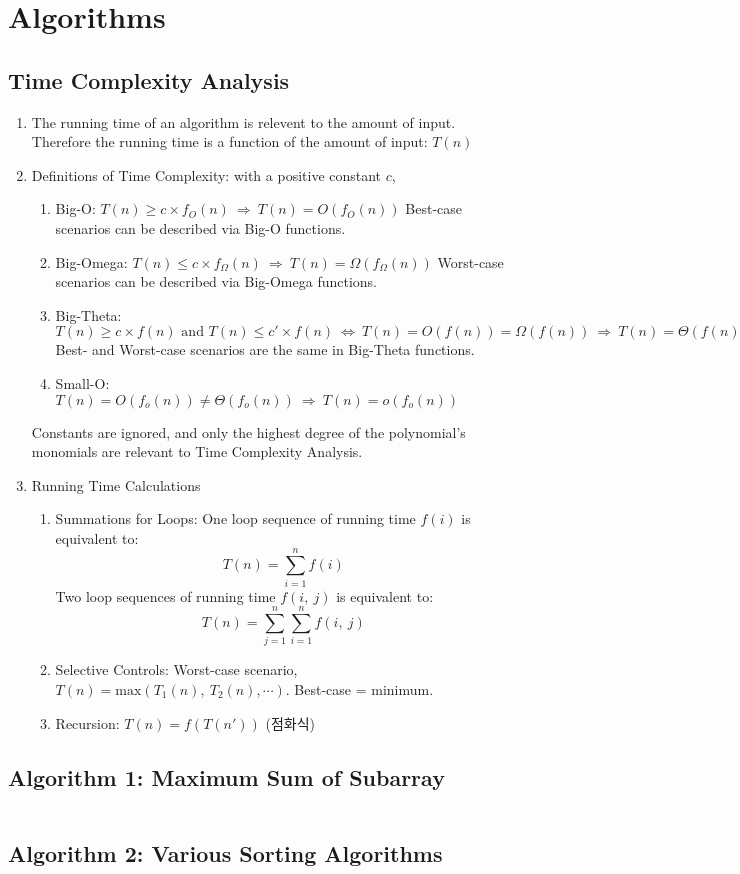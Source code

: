 \part{Algorithms}

\chapter{Time Complexity Analysis}
\begin{enumerate}
\item The running time of an algorithm is relevent to the amount of input.
    Therefore the running time is a function of the amount of input: $T(n)$
\item Definitions of Time Complexity: with a positive constant $c$,
    \begin{enumerate}
    \item Big-O: $T(n)\geq c\times f_O(n)~\Rightarrow~T(n)=O\left(f_O(n)\right)$
        Best-case scenarios can be described via Big-O functions.
    \item Big-Omega: $T(n)\leq c\times f_{\Omega}(n)~\Rightarrow~T(n)=\Omega
        \left(f_{\Omega}(n)\right)$ Worst-case scenarios can be described via
        Big-Omega functions.
    \item Big-Theta: $T(n)\geq c\times f(n)\text{ and }T(n)\leq c'\times f(n)~
        \Leftrightarrow~T(n)=O(f(n))=\Omega(f(n))~\Rightarrow~T(n)=\Theta(f(n))$
        Best- and Worst-case scenarios are the same in Big-Theta functions.
    \item Small-O: $T(n)=O(f_o(n))\neq\Theta(f_o(n))~\Rightarrow~T(n)=o(f_o(n))$
    \end{enumerate}
    Constants are ignored, and only the highest degree of the polynomial's
    monomials are relevant to Time Complexity Analysis.
\item Running Time Calculations
    \begin{enumerate}
    \item Summations for Loops: One loop sequence of running time $f(i)$ is
        equivalent to: \[ T(n)=\sum_{i=1}^nf(i) \] Two loop sequences of running
        time $f(i,~j)$ is equivalent to:\[T(n)=\sum_{j=1}^n\sum_{i=1}^nf(i,~j)\]
    \item Selective Controls: Worst-case scenario, $T(n)=\mathrm{max}\left(
        T_1(n),~T_2(n),\cdots\right)$. Best-case = minimum.
    \item Recursion: $T(n)=f(T(n'))$ (점화식)
    \end{enumerate}
\end{enumerate}

\chapter{Algorithm 1: Maximum Sum of Subarray}
\inputminted{cpp}{../Algorithms/maxsubarray.cpp}

\chapter{Algorithm 2: Various Sorting Algorithms}
\inputminted{cpp}{../Algorithms/sort.hpp}
